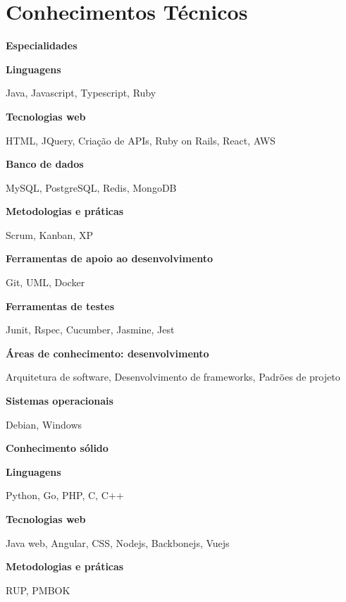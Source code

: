 \section{Conhecimentos Técnicos}
{\fontsize{20}{30}\selectfont \textbf{Especialidades}}\newline{}

\textbf{Linguagens}

Java, Javascript, Typescript, Ruby \newline{}

\textbf{Tecnologias web}

HTML, JQuery, Criação de APIs, Ruby on Rails, React, AWS \newline{}

\textbf{Banco de dados}

MySQL, PostgreSQL, Redis, MongoDB \newline{}

\textbf{Metodologias e práticas}

Scrum, Kanban, XP \newline{}

\textbf{Ferramentas de apoio ao desenvolvimento}

Git, UML, Docker \newline{}

\textbf{Ferramentas de testes}

Junit, Rspec, Cucumber, Jasmine, Jest \newline{}

\textbf{Áreas de conhecimento: desenvolvimento}

Arquitetura de software, Desenvolvimento de frameworks, Padrões de projeto \newline{}

\textbf{Sistemas operacionais}

Debian, Windows \newline{}

{\fontsize{20}{30}\selectfont \textbf{Conhecimento sólido}}\newline{}

\textbf{Linguagens}

Python, Go, PHP, C, C++ \newline{}

\textbf{Tecnologias web}

Java web, Angular, CSS, Nodejs, Backbonejs, Vuejs \newline{}

\textbf{Metodologias e práticas}

RUP, PMBOK \newline{}

